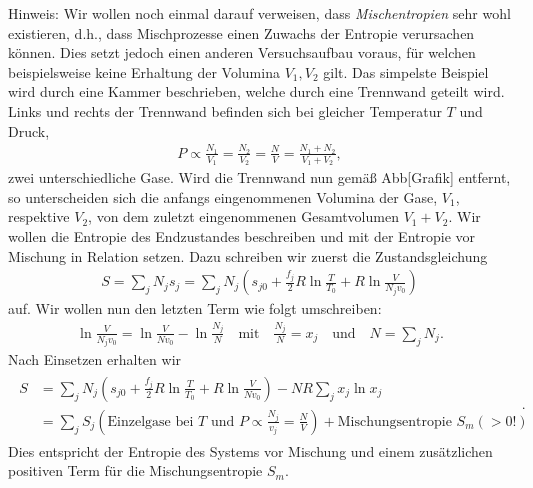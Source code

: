 Hinweis: Wir wollen noch einmal darauf verweisen, dass \emph{Mischentropien} sehr wohl existieren, d.h., dass Mischprozesse einen Zuwachs der Entropie verursachen können. Dies setzt jedoch einen anderen Versuchsaufbau voraus, für welchen beispielsweise keine Erhaltung der Volumina $V_1,V_2$ gilt. Das simpelste Beispiel wird durch eine Kammer beschrieben, welche durch eine Trennwand geteilt wird. Links und rechts der Trennwand befinden sich bei gleicher Temperatur $T$ und Druck,
\begin{align*}
    P\propto\frac{N_1}{V_1}=\frac{N_2}{V_2}=\frac{N}{V}=\frac{N_1+N_2}{V_1+V_2},
\end{align*}
zwei unterschiedliche Gase. Wird die Trennwand nun gemäß Abb[Grafik] entfernt, so unterscheiden sich die anfangs eingenommenen Volumina der Gase, $V_1$, respektive $V_2$, von dem zuletzt eingenommenen Gesamtvolumen $V_1+V_2$.
Wir wollen die Entropie des Endzustandes beschreiben und mit der Entropie vor Mischung in Relation setzen. Dazu schreiben wir zuerst die Zustandsgleichung
\begin{align*}
    S=\sum_jN_js_j=\sum_jN_j\left(s_{j0}+\frac{f_j}{2}R\ln\frac{T}{T_0}+R\ln\frac{V}{N_jv_0}\right)
\end{align*}
auf. Wir wollen nun den letzten Term wie folgt umschreiben:
\begin{align*}
    \ln\frac{V}{N_jv_0}=\ln\frac{V}{Nv_0}-\ln\frac{N_j}{N}\quad\text{mit}\quad\frac{N_j}{N}=x_j\quad\text{und}\quad N=\sum_jN_j.
\end{align*}
Nach Einsetzen erhalten wir
\begin{align*}
    \boxed{
        \begin{aligned}
            S & =\sum_jN_j\left(s_{j0}+\frac{f_j}{2}R\ln\frac{T}{T_0}+R\ln\frac{V}{Nv_0}\right)-NR\sum_jx_j\ln x_j                 \\
              & =\sum_jS_j(\text{Einzelgase bei $T$ und }P\propto \frac{N_j}{v_j}=\frac{N}{V})+\text{Mischungsentropie $S_m(>0!)$}
        \end{aligned}
    }\:.
\end{align*}
Dies entspricht der Entropie des Systems vor Mischung und einem zusätzlichen positiven Term für die Mischungsentropie $S_m$.
